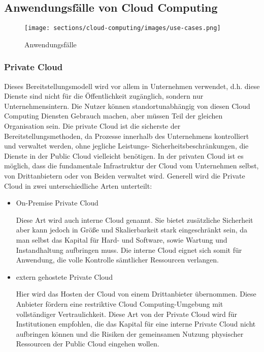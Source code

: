 \subsection{Anwendungsfälle von Cloud Computing}

\begin{figure}[h]
    \centering
    \texttt{[image: sections/cloud-computing/images/use-cases.png]}
    \caption{Anwendungsfälle}
    \label{fig:kimldl-comparison}
\end{figure}

\subsubsection{Private Cloud}

Dieses Bereitstellungsmodell wird vor allem in Unternehmen verwendet, d.h. diese Dienste sind nicht für die Öffentlichkeit zugänglich, sondern nur Unternehmensintern. Die Nutzer können standortunabhängig von diesen Cloud Computing Diensten Gebrauch machen, aber müssen Teil der gleichen Organisation sein. Die private Cloud ist die sicherste der Bereitstellungsmethoden, da Prozesse innerhalb des Unternehmens kontrolliert und verwaltet werden, ohne jegliche Leistungs- Sicherheitsbeschränkungen, die Dienste in der Public Cloud vielleicht benötigen. In der privaten Cloud ist es möglich, dass die fundamentale Infrastruktur der Cloud vom Unternehmen selbst, von Drittanbietern oder von Beiden verwaltet wird. Generell wird die Private Cloud in zwei unterschiedliche Arten unterteilt:

\begin{itemize}
    \item On-Premise Private Cloud
    \begin{sloppypar}
        Diese Art wird auch interne Cloud genannt. Sie bietet zusätzliche Sicherheit aber kann jedoch in Größe und Skalierbarkeit stark eingeschränkt sein, da man selbst das Kapital für Hard- und Software, sowie Wartung und Instandhaltung aufbringen muss. Die interne Cloud eignet sich somit für Anwendung, die volle Kontrolle sämtlicher Ressourcen verlangen.
    \end{sloppypar}
    \item extern gehostete Private Cloud
    \begin{sloppypar} 
        Hier wird das Hosten der Cloud von einem Drittanbieter übernommen. Diese Anbieter fördern eine restriktive Cloud Computing-Umgebung mit vollständiger Vertraulichkeit. Diese Art von der Private Cloud wird für Institutionen empfohlen, die das Kapital für eine interne Private Cloud nicht aufbringen können und die Risiken der gemeinsamen Nutzung physischer Ressourcen der Public Cloud eingehen wollen.   
    \end{sloppypar} 
\end{itemize}

